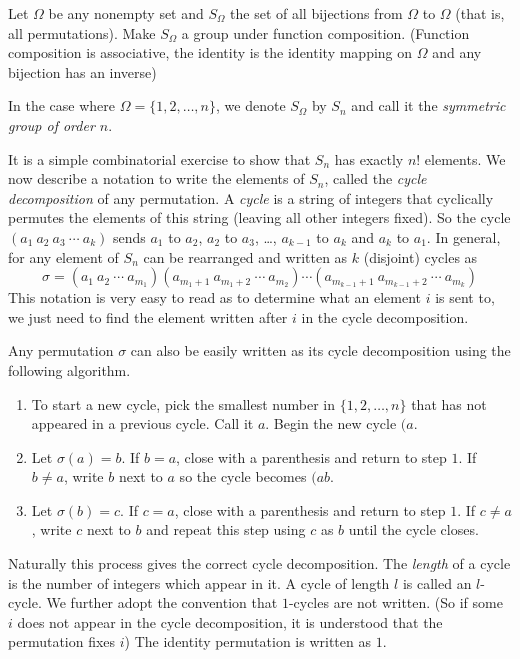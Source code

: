 Let $\Omega$ be any nonempty set and $S_\Omega$ the set of all bijections from $\Omega$ to $\Omega$ (that is, all permutations). Make $S_\Omega$ a group under function composition. (Function composition is associative, the identity is the identity mapping on $\Omega$ and any bijection has an inverse)

In the case where $\Omega=\{1,2,\ldots,n\}$, we denote $S_\Omega$ by $S_n$ and call it the \textit{symmetric group of order $n$}.

It is a simple combinatorial exercise to show that $S_n$ has exactly $n!$ elements. We now describe a notation to write the elements of $S_n$, called the \textit{cycle decomposition} of any permutation. A \textit{cycle} is a string of integers that cyclically permutes the elements of this string (leaving all other integers fixed). So the cycle $(a_1\:a_2\:a_3\:\cdots\:a_k)$ sends $a_1$ to $a_2$, $a_2$ to $a_3$, \ldots, $a_{k-1}$ to $a_k$ and $a_k$ to $a_1$. In general, for any element of $S_n$ can be rearranged and written as $k$ (disjoint) cycles as
$$\sigma=(a_1\:a_2\:\cdots\:a_{m_1})(a_{m_1+1}\:a_{m_1+2}\:\cdots\:a_{m_2})\cdots(a_{m_{k-1}+1}\:a_{m_{k-1}+2}\:\cdots\:a_{m_k})$$
This notation is very easy to read as to determine what an element $i$ is sent to, we just need to find the element written after $i$ in the cycle decomposition.

Any permutation $\sigma$ can also be easily written as its cycle decomposition using the following algorithm.
\begin{enumerate}
    \item To start a new cycle, pick the smallest number in $\{1,2,\ldots,n\}$ that has not appeared in a previous cycle. Call it $a$. Begin the new cycle $(a$.
    \item Let $\sigma(a)=b$. If $b=a$, close with a parenthesis and return to step $1$. If $b\neq a$, write $b$ next to $a$ so the cycle becomes $(a b$.
    \item Let $\sigma(b)=c$. If $c=a$, close with a parenthesis and return to step $1$. If $c\neq a$, write $c$ next to $b$ and repeat this step using $c$ as $b$ until the cycle closes.
\end{enumerate}
Naturally this process gives the correct cycle decomposition.
The \textit{length} of a cycle is the number of integers which appear in it. A cycle of length $l$ is called an $l$-cycle. We further adopt the convention that $1$-cycles are not written. (So if some $i$ does not appear in the cycle decomposition, it is understood that the permutation fixes $i$) The identity permutation is written as $1$.

